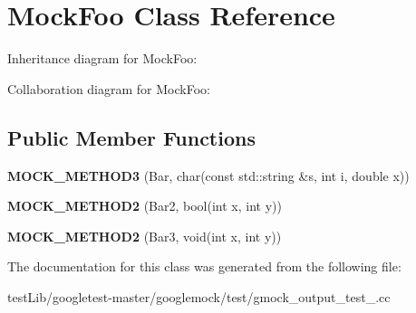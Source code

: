 \hypertarget{classMockFoo}{}\section{Mock\+Foo Class Reference}
\label{classMockFoo}


Inheritance diagram for Mock\+Foo\+:


Collaboration diagram for Mock\+Foo\+:
\subsection*{Public Member Functions}
\begin{DoxyCompactItemize}
\item 
\mbox{\label{classMockFoo_a8f323a65afd93c0605a02b278b101d18}} 
{\bfseries M\+O\+C\+K\+\_\+\+M\+E\+T\+H\+O\+D3} (Bar, char(const std\+::string \&s, int i, double x))
\item 
\mbox{\label{classMockFoo_ae1d53263d5efcf38fda3990302fac6ab}} 
{\bfseries M\+O\+C\+K\+\_\+\+M\+E\+T\+H\+O\+D2} (Bar2, bool(int x, int y))
\item 
\mbox{\label{classMockFoo_af1e0c374cadacdaa7ca69f9c38d85543}} 
{\bfseries M\+O\+C\+K\+\_\+\+M\+E\+T\+H\+O\+D2} (Bar3, void(int x, int y))
\end{DoxyCompactItemize}


The documentation for this class was generated from the following file\+:\begin{DoxyCompactItemize}
\item 
test\+Lib/googletest-\/master/googlemock/test/gmock\+\_\+output\+\_\+test\+\_\+.\+cc\end{DoxyCompactItemize}
